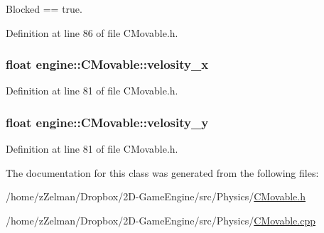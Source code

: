 Blocked == true. 



Definition at line 86 of file C\-Movable.\-h.

\hypertarget{classengine_1_1CMovable_a7bc34defa8ea4190a6c3011ef254e48b}{
\subsubsection[{velosity\-\_\-x}]{\setlength{\rightskip}{0pt plus 5cm}float engine\-::\-C\-Movable\-::velosity\-\_\-x\hspace{0.3cm}{\ttfamily [protected]}}}\label{classengine_1_1CMovable_a7bc34defa8ea4190a6c3011ef254e48b}


Definition at line 81 of file C\-Movable.\-h.

\hypertarget{classengine_1_1CMovable_a7a1a4581926122ae31753261d1d35cf3}{
\subsubsection[{velosity\-\_\-y}]{\setlength{\rightskip}{0pt plus 5cm}float engine\-::\-C\-Movable\-::velosity\-\_\-y\hspace{0.3cm}{\ttfamily [protected]}}}\label{classengine_1_1CMovable_a7a1a4581926122ae31753261d1d35cf3}


Definition at line 81 of file C\-Movable.\-h.



The documentation for this class was generated from the following files\-:\begin{DoxyCompactItemize}
\item 
/home/z\-Zelman/\-Dropbox/2\-D-\/\-Game\-Engine/src/\-Physics/\hyperlink{CMovable_8h}{C\-Movable.\-h}\item 
/home/z\-Zelman/\-Dropbox/2\-D-\/\-Game\-Engine/src/\-Physics/\hyperlink{CMovable_8cpp}{C\-Movable.\-cpp}\end{DoxyCompactItemize}
